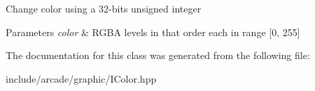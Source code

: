 Change color using a 32-\/bits unsigned integer 
\begin{DoxyParams}{Parameters}
{\em color} & R\+G\+BA levels in that order each in range \mbox{[}0, 255\mbox{]} \\
\hline
\end{DoxyParams}


The documentation for this class was generated from the following file\+:\begin{DoxyCompactItemize}
\item 
include/arcade/graphic/I\+Color.\+hpp\end{DoxyCompactItemize}
